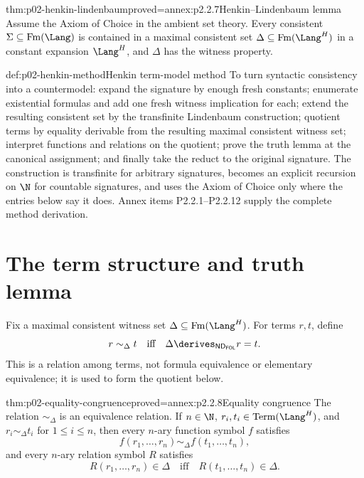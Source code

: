 \begin{hblemma}{thm:p02-henkin-lindenbaum}{proved=annex:p2.2.7}{Henkin--Lindenbaum lemma}
Assume the Axiom of Choice in the ambient set theory.  Every consistent
\(\Sigma\subseteq\operatorname{Fm}(\Lang)\) is contained in a maximal consistent
set \(\Delta\subseteq\operatorname{Fm}(\Lang^H)\) in a constant expansion
\(\Lang^H\), and \(\Delta\) has the witness property.
\end{hblemma}

\begin{hbmethod}{def:p02-henkin-method}{Henkin term-model method}
To turn syntactic consistency into a countermodel: expand the signature by
enough fresh constants; enumerate existential formulas and add one fresh
witness implication for each; extend the resulting consistent set by the
transfinite Lindenbaum construction; quotient terms by equality derivable
from the resulting maximal consistent witness set; interpret functions and
relations on the quotient; prove the truth lemma at the canonical assignment;
and finally take the reduct to the original signature.  The construction is
transfinite for arbitrary signatures, becomes an explicit recursion on
\(\N\) for countable signatures, and uses the Axiom of Choice only where the
entries below say it does.  Annex items P2.2.1--P2.2.12 supply the complete
method derivation.
\end{hbmethod}

\section{The term structure and truth lemma}
\label{sec:p02-first-order-term-structure}

Fix a maximal consistent witness set
\(\Delta\subseteq\operatorname{Fm}(\Lang^H)\).  For terms \(r,t\), define
\[
 r\sim_\Delta t
 \quad\text{iff}\quad
 \Delta\derives_{\mathsf{ND}_{\mathsf{FOL}}}r=t.
\]
This is a relation among terms, not formula equivalence or elementary
equivalence; it is used to form the quotient below.

\begin{hblemma}{thm:p02-equality-congruence}{proved=annex:p2.2.8}{Equality congruence}
The relation \(\sim_\Delta\) is an equivalence relation.  If \(n\in\N\),
\(r_i,t_i\in\operatorname{Term}(\Lang^H)\), and
\(r_i\sim_\Delta t_i\) for \(1\leq i\leq n\), then every \(n\)-ary
function symbol \(f\) satisfies
\[
 f(r_1,\ldots,r_n)\sim_\Delta f(t_1,\ldots,t_n),
\]
and every \(n\)-ary relation symbol \(R\) satisfies
\[
 R(r_1,\ldots,r_n)\in\Delta
 \quad\text{iff}\quad
 R(t_1,\ldots,t_n)\in\Delta.
\]
\end{hblemma}

